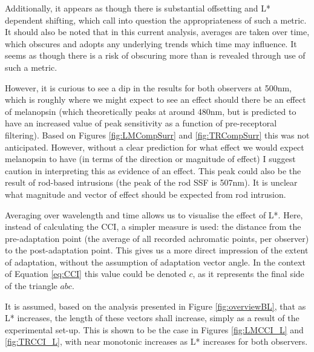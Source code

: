 Additionally, it appears as though there is substantial offsetting and L* dependent shifting, which call into question the appropriateness of such a metric. It should also be noted that in this current analysis, averages are taken over time, which obscures and adopts any underlying trends which time may influence. It seems as though there is a risk of obscuring more than is revealed through use of such a metric.

However, it is curious to see a dip in the results for both observers at 500nm, which is roughly where we might expect to see an effect should there be an effect of melanopsin (which theoretically peaks at around 480nm, but is predicted to have an increased value of peak sensitivity as a function of pre-receptoral filtering). Based on Figures \ref{fig:LMCompSurr} and \ref{fig:TRCompSurr} this was not anticipated. However, without a clear prediction for what effect we would expect melanopsin to have (in terms of the direction or magnitude of effect) I suggest caution in interpreting this as evidence of an effect. This peak could also be the result of rod-based intrusions (the peak of the rod \gls{SSF} is 507nm). It is unclear what magnitude and vector of effect should be expected from rod intrusion.

Averaging over wavelength and time allows us to visualise the effect of L*. Here, instead of calculating the \gls{CCI}, a simpler measure is used: the distance from the pre-adaptation point (the average of all recorded achromatic points, per observer) to the post-adaptation point. This gives us a more direct impression of the extent of adaptation, without the assumption of adaptation vector angle. In the context of Equation \ref{eq:CCI} this value could be denoted $c$, as it represents the final side of the triangle $abc$. 

It is assumed, based on the analysis presented in Figure \ref{fig:overviewBL}, that as L* increases, the length of these vectors shall increase, simply as a result of the experimental set-up. This is shown to be the case in Figures \ref{fig:LMCCI_L} and \ref{fig:TRCCI_L}, with near monotonic increases as L* increases for both observers.

